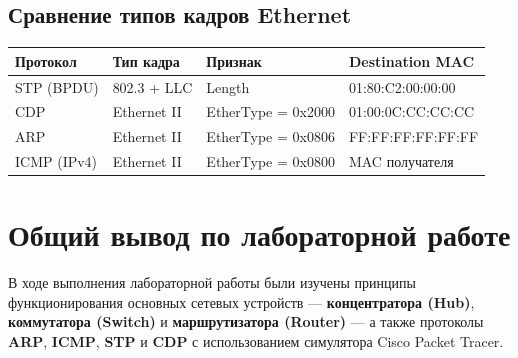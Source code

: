 \begin{enumerate}
\subsection*{Сравнение типов кадров Ethernet}
\begin{center}
\begin{tabular}{|l|l|l|l|}
\hline
\textbf{Протокол} & \textbf{Тип кадра} & \textbf{Признак} & \textbf{Destination MAC} \\
\hline
STP (BPDU) & 802.3 + LLC & Length & 01:80:C2:00:00:00 \\
CDP & Ethernet II & EtherType = 0x2000 & 01:00:0C:CC:CC:CC \\
ARP & Ethernet II & EtherType = 0x0806 & FF:FF:FF:FF:FF:FF \\
ICMP (IPv4) & Ethernet II & EtherType = 0x0800 & MAC получателя \\
\hline
\end{tabular}
\end{center}

\end{enumerate}

\newpage
\section*{Общий вывод по лабораторной работе}

В ходе выполнения лабораторной работы были изучены принципы функционирования основных сетевых устройств — \textbf{концентратора (Hub)}, \textbf{коммутатора (Switch)} и \textbf{маршрутизатора (Router)} — а также протоколы \textbf{ARP}, \textbf{ICMP}, \textbf{STP} и \textbf{CDP} с использованием симулятора Cisco Packet Tracer.

